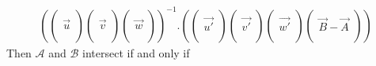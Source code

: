 \documentclass[12pt, a4paper]{article}
\begin{document}
\begin{equation}
\begin{array}{l}
\left(\left(\begin{array}{l}\\\overrightarrow{u}\\\\\end{array}\right)\left(\begin{array}{l}\\\overrightarrow{v}\\\\\end{array}\right)\left(\begin{array}{l}\\\overrightarrow{w}\\\\\end{array}\right)\right)^{-1}.\left(\left(\begin{array}{l}\\\overrightarrow{u'}\\\\\end{array}\right)\left(\begin{array}{l}\\\overrightarrow{v'}\\\\\end{array}\right)\left(\begin{array}{l}\\\overrightarrow{w'}\\\\\end{array}\right)\left(\begin{array}{l}\\\overrightarrow{B}-\overrightarrow{A}\\\\\end{array}\right)\right)
\end{array}
\end{equation}
Then $\mathcal{A}$ and $\mathcal{B}$ intersect if and only if
\end{document}

